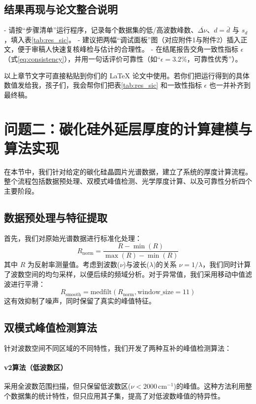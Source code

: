 \documentclass{ctexart} %
\begin{document}
\subsection*{结果再现与论文整合说明}
- 请按“步骤清单”运行程序，记录每个数据集的低/高波数峰数、\(\overline{\Delta\nu}\)、\(d=\bar d\) 与 \(s_d\)，填入表\ref{tab:res_sic}。
- 建议把两幅“调试面板”图（对应附件1与附件2）插入正文，便于审稿人快速复核峰检与估计的合理性。
- 在结尾报告交角一致性指标 \(\epsilon\)（式\eqref{eq:consistency}），并用一句话评价可靠性（如“\(\epsilon=3.2\%\)，可靠性优秀”）。


以上章节文字可直接粘贴到你们的 LaTeX 论文中使用。若你们把运行得到的具体数值发给我，孩子们，我会帮你们把表\ref{tab:res_sic} 和一致性指标 \(\epsilon\) 也一并补齐到最终稿。


\section{问题二：碳化硅外延层厚度的计算建模与算法实现}
\label{sec:problem2} 在本节中，我们针对给定的碳化硅晶圆片光谱数据，建立了系统的厚度计算流程。整个流程包括数据预处理、双模式峰值检测、光学厚度计算、以及可靠性分析四个主要阶段。

\subsection{数据预处理与特征提取}
\label{subsec:data-preprocess}
首先，我们对原始光谱数据进行标准化处理：
\begin{equation}
    R_{\text{norm}} = \frac{R - \min(R)}{\max(R) - \min(R)}
\end{equation}
其中 $R$ 为反射率测量值。考虑到波数($\nu$)与波长($\lambda$)的关系 $\nu=1/\lambda$，我们同时计算了波数空间的均匀采样，以便后续的频域分析。对于异常值，我们采用移动中值滤波进行平滑：
\begin{equation}
    R_{\text{smooth}} = \text{medfilt}(R_{\text{norm}}, \text{window\_size}=11)
\end{equation}
这有效抑制了噪声，同时保留了真实的峰值特征。 \subsection{双模式峰值检测算法}
\label{subsec:peak-detection} 针对波数空间不同区域的不同特性，我们开发了两种互补的峰值检测算法：

\paragraph{v2算法（低波数区）}
采用全波数范围扫描，但只保留低波数区($\nu<2000\,\mathrm{cm}^{-1}$)的峰值。这种方法利用整个数据集的统计特性，但只应用其子集，提高了对低波数峰值的特异性。
\end{document}
